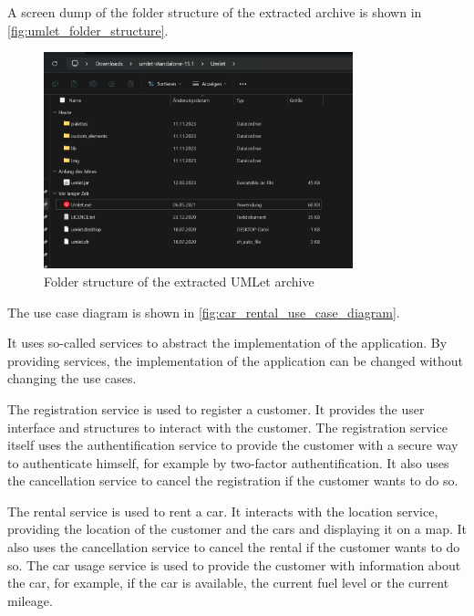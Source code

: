 A screen dump of the folder structure of the extracted archive is shown in \autoref{fig:umlet_folder_structure}.
\begin{figure}
    \centering
    \includegraphics[width=0.8\textwidth]{figures/goLang/carRental/carRental_umletInstallation.png}
    \caption{Folder structure of the extracted UMLet archive}
    \label{fig:umlet_folder_structure}
\end{figure}

The use case diagram is shown in \autoref{fig:car_rental_use_case_diagram}.

It uses so-called services to abstract the implementation of the application.
By providing services, the implementation of the application can be changed without changing the use cases.

The registration service is used to register a customer.
It provides the user interface and structures to interact with the customer.
The registration service itself uses the authentification service to provide the customer with a secure way to authenticate himself, for example by two-factor authentification.
It also uses the cancellation service to cancel the registration if the customer wants to do so.

The rental service is used to rent a car.
It interacts with the location service, providing the location of the customer and the cars and displaying it on a map.
It also uses the cancellation service to cancel the rental if the customer wants to do so.
The car usage service is used to provide the customer with information about the car, for example, if the car is available, the current fuel level or the current mileage.

